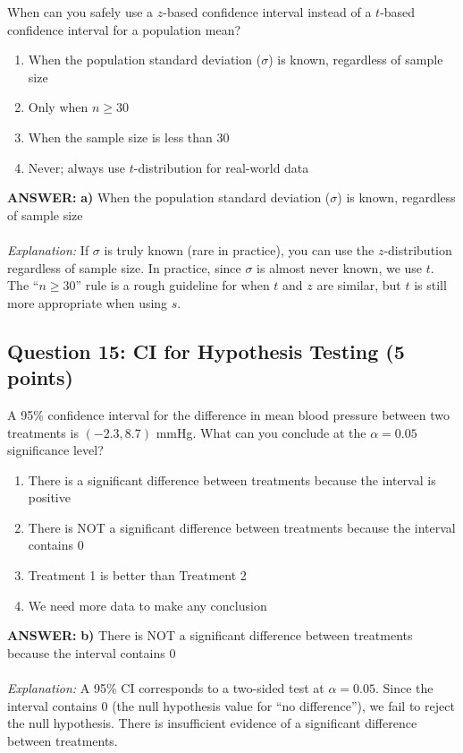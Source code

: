 \documentclass[11pt]{article}
\newcommand{\answer}[1]{\par\vspace{0.3em}\colorbox{green!10}{\parbox{\dimexpr\textwidth-2\fboxsep}{\textbf{ANSWER:} #1}}\vspace{0.3em}\par}
\begin{document}
When can you safely use a $z$-based confidence interval instead of a $t$-based confidence interval for a population mean?

\begin{enumerate}[label=\alph*)]
\item When the population standard deviation ($\sigma$) is known, regardless of sample size
\item Only when $n \geq 30$
\item When the sample size is less than 30
\item Never; always use $t$-distribution for real-world data
\end{enumerate}

\answer{\textbf{a)} When the population standard deviation ($\sigma$) is known, regardless of sample size \\ \\
\textit{Explanation:} If $\sigma$ is truly known (rare in practice), you can use the $z$-distribution regardless of sample size. In practice, since $\sigma$ is almost never known, we use $t$. The ``$n \geq 30$'' rule is a rough guideline for when $t$ and $z$ are similar, but $t$ is still more appropriate when using $s$.}

\subsection*{Question 15: CI for Hypothesis Testing (5 points)}

A 95\% confidence interval for the difference in mean blood pressure between two treatments is $(-2.3, 8.7)$ mmHg. What can you conclude at the $\alpha = 0.05$ significance level?

\begin{enumerate}[label=\alph*)]
\item There is a significant difference between treatments because the interval is positive
\item There is NOT a significant difference between treatments because the interval contains 0
\item Treatment 1 is better than Treatment 2
\item We need more data to make any conclusion
\end{enumerate}

\answer{\textbf{b)} There is NOT a significant difference between treatments because the interval contains 0 \\ \\
\textit{Explanation:} A 95\% CI corresponds to a two-sided test at $\alpha = 0.05$. Since the interval contains 0 (the null hypothesis value for ``no difference''), we fail to reject the null hypothesis. There is insufficient evidence of a significant difference between treatments.}
\end{document}
